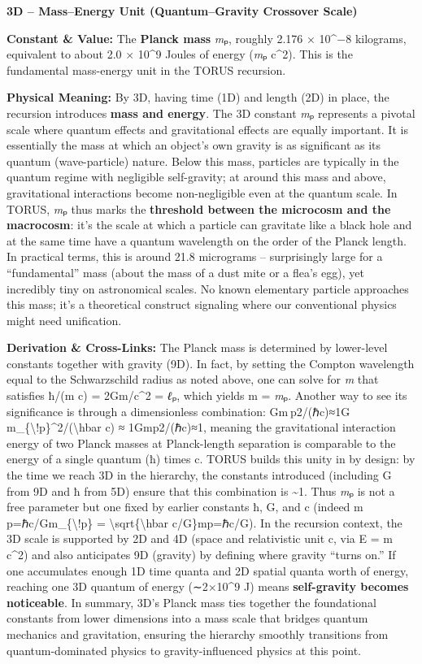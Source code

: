 \documentclass[]{article}
\begin{document}
\textbf{3D -- Mass--Energy Unit (Quantum--Gravity Crossover Scale)}

\textbf{Constant \& Value:} The \textbf{Planck mass} \emph{m}ₚ, roughly
2.176 × 10\^{}−8 kilograms​, equivalent to about 2.0 × 10\^{}9 Joules of
energy (\emph{m}ₚ c\^{}2). This is the fundamental mass-energy unit in
the TORUS recursion.

\textbf{Physical Meaning:} By 3D, having time (1D) and length (2D) in
place, the recursion introduces \textbf{mass and energy}. The 3D
constant \emph{m}ₚ represents a pivotal scale where quantum effects and
gravitational effects are equally important. It is essentially the mass
at which an object's own gravity is as significant as its quantum
(wave-particle) nature​. Below this mass, particles are typically in the
quantum regime with negligible self-gravity; at around this mass and
above, gravitational interactions become non-negligible even at the
quantum scale. In TORUS, \emph{m}ₚ thus marks the \textbf{threshold
between the microcosm and the macrocosm}​: it's the scale at which a
particle can gravitate like a black hole and at the same time have a
quantum wavelength on the order of the Planck length. In practical
terms, this is around 21.8 micrograms -- surprisingly large for a
``fundamental'' mass (about the mass of a dust mite or a flea's egg),
yet incredibly tiny on astronomical scales​. No known elementary
particle approaches this mass; it's a theoretical construct signaling
where our conventional physics might need unification.

\textbf{Derivation \& Cross-Links:} The Planck mass is determined by
lower-level constants together with gravity (9D). In fact, by setting
the Compton wavelength equal to the Schwarzschild radius as noted above,
one can solve for \emph{m} that satisfies ħ/(m c) = 2Gm/c\^{}2 =
\emph{ℓ}ₚ, which yields m = \emph{m}ₚ​. Another way to see its
significance is through a dimensionless combination: Gm ⁣p2/(ℏc)≈1G
m\_\{\textbackslash{}!p\}\^{}2/(\textbackslash{}hbar c) ≈
1Gmp2​/(ℏc)≈1​, meaning the gravitational interaction energy of two
Planck masses at Planck-length separation is comparable to the energy of
a single quantum (ħ) times c. TORUS builds this unity in by design: by
the time we reach 3D in the hierarchy, the constants introduced
(including G from 9D and ħ from 5D) ensure that this combination is
\textasciitilde{}1​. Thus \emph{m}ₚ is not a free parameter but one
fixed by earlier constants ħ, G, and c (indeed
m ⁣p=ℏc/Gm\_\{\textbackslash{}!p\} =
\textbackslash{}sqrt\{\textbackslash{}hbar c/G\}mp​=ℏc/G​). In the
recursion context, the 3D scale is supported by 2D and 4D (space and
relativistic unit c, via E = m c\^{}2) and also anticipates 9D (gravity)
by defining where gravity ``turns on.'' If one accumulates enough 1D
time quanta and 2D spatial quanta worth of energy, reaching one 3D
quantum of energy (∼2×10\^{}9 J) means \textbf{self-gravity becomes
noticeable}​. In summary, 3D's Planck mass ties together the
foundational constants from lower dimensions into a mass scale that
bridges quantum mechanics and gravitation, ensuring the hierarchy
smoothly transitions from quantum-dominated physics to
gravity-influenced physics at this point.
\end{document}
